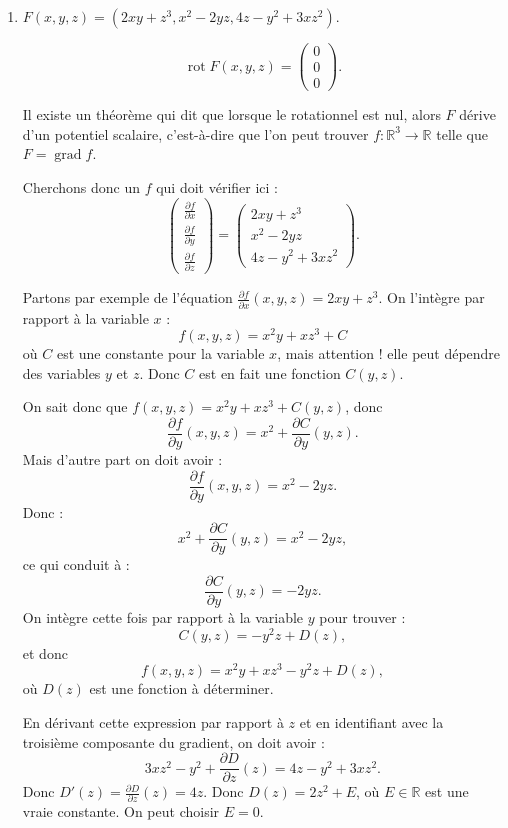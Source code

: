 \documentclass[11pt,a4paper]{article}
\newcommand{\Rr}{\mathbb{R}} \newcommand{\R}{\mathbb{R}}
\theoremstyle{exostyle}
\newcommand{\grad}{\operatorname{grad}} %
\newcommand{\rot}{\operatorname{rot}}
\begin{document}
\begin{enumerate}
	\item $F(x,y,z) = (2xy+z^3, x^2-2yz, 4z-y^2+3xz^2)$.
	
	\[
	\rot F (x,y,z) = 
	\begin{pmatrix}
	0 \\ 0 \\ 0	
	\end{pmatrix}.
	\]
	
	Il existe un théorème qui dit que lorsque le rotationnel est nul, alors $F$ dérive d'un potentiel scalaire, c'est-à-dire que l'on peut trouver $f : \Rr^3 \to \Rr$ telle que $F = \grad f$.
	
	Cherchons donc un $f$ qui doit vérifier ici :
	\[
	\begin{pmatrix}	
		\frac{\partial f}{\partial x} \\	
		\frac{\partial f}{\partial y} \\			
		\frac{\partial f}{\partial z} 
	\end{pmatrix} 	
	= 	
	\begin{pmatrix}	
	2xy+z^3 \\ x^2-2yz \\ 4z-y^2+3xz^2	
	\end{pmatrix}.
	\]
	
	Partons par exemple de l'équation $\frac{\partial f}{\partial x}(x,y,z) = 2xy+z^3$.
	On l'intègre par rapport à la variable $x$ :
	\[ f(x,y,z) = x^2y + xz^3 + C\]
	où $C$ est une constante pour la variable $x$, mais attention ! elle peut dépendre des variables $y$ et $z$. Donc $C$ est en fait une fonction $C(y,z)$.
	
	On sait donc que $f(x,y,z) = x^2y + xz^3 + C(y,z)$, donc
	\[\frac{\partial f}{\partial y}(x,y,z) = x^2+\frac{\partial C}{\partial y}(y,z).\]
	Mais d'autre part on doit avoir :
	\[
	\frac{\partial f}{\partial y}(x,y,z) = x^2-2yz.
	\]
	Donc :
	\[
	x^2+\frac{\partial C}{\partial y}(y,z) = x^2-2yz,
	\]
	ce qui conduit à :
	\[
	\frac{\partial C}{\partial y}(y,z) = -2yz.
	\]
	On intègre cette fois par rapport à la variable $y$ pour trouver :
	\[
	C(y,z) = -y^2z + D(z),\]
	et donc
	\[
	f(x,y,z) = x^2y + xz^3 -y^2z + D(z),
	\]
	où $D(z)$ est une fonction à déterminer.

	En dérivant cette expression par rapport à $z$ et en identifiant avec la troisième composante du gradient, on doit avoir :
	\[ 3xz^2 -y^2 + \frac{\partial D}{\partial z}(z) = 4z-y^2+3xz^2. \]
	Donc $D'(z) = \frac{\partial D}{\partial z}(z) = 4z$. Donc $D(z)=2z^2+E$, où $E \in \Rr$ est une vraie constante. On peut choisir $E=0$.
	

\end{enumerate}
\end{document}
